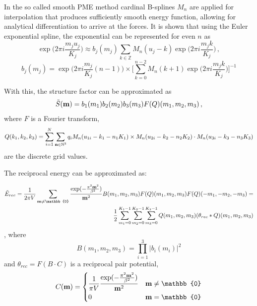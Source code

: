 \documentclass[12pt,a4paper]{report}
\newcommand{\draft}[1]{#1}
\begin{document}

In the so called smooth PME method \cite{spme} cardinal B-splines $M_n$ are applied for interpolation that produces sufficiently smooth energy function, allowing for analytical differentiation to arrive at the forces.
It is shown that using the Euler exponential spline, the exponential can be represented for even $n$ as
\[\exp\Big(2\pi i\frac{m_j u_j}{K_j}\Big) \approx b_j(m_j) \sum\limits_{k\in \mathbb{Z}}M_n(u_j - k)\exp\Big(2\pi i\frac{m_j k}{K_j}\Big)\,,\]
\begin{equation}\label{BSpline}
b_j(m_j) = \exp\Big(2\pi i\frac{m_j}{K_j}(n-1)\Big) \times \Big[\sum\limits_{k=0}^{n-2}M_n(k + 1)\exp\Big(2\pi i\frac{m_j k}{K_j}\Big) \Big]^{-1}
\end{equation}

With this, the structure factor can be approximated as
\[\tilde{S}(\bold{m}) = b_1(m_1) b_2(m_2)b_3(m_3) F(Q)(m_1, m_2, m_3)\,,\]
where $F$ is a Fourier transform,
\begin{equation} \label{Qspread}
Q(k_1, k_2, k_3) = \sum\limits_{i=1}^N \sum\limits_{\bold{n} \in \mathbb{N}^3} q_i M_n(u_{1i} -k_1 - n_1 K_1)\times M_n(u_{2i} -k_2 - n_2 K_2) \cdot M_n(u_{3i} -k_3 - n_3 K_3)
\end{equation}
are the discrete grid values.

The reciprocal energy can be approximated as:

\begin{equation}  \label{Erecfull}
\begin{split}
\tilde{E}_{rec} = \frac{1}{2 \pi V}\sum\limits_{\bold{m} \neq \mathbb{0}}\frac{\exp(-\frac{\pi^2\bold{m}^2}{\beta^2})}{\bold{m}^2} B(m_1, m_2, m_3) F(Q)(m_1, m_2, m_3)F(Q)(-m_1, -m_2, -m_3)= \\
\frac{1}{2}\sum\limits_{m_1 = 0}^{K_1 -1}\sum\limits_{m_2 = 0}^{K_2 -1}\sum\limits_{m_3 = 0}^{K_3 -1}Q(m_1, m_2, m_3)(\theta_{rec} \ast Q)(m_1, m_2, m_3)
\end{split}
\end{equation}, where 
\begin{equation} 
B(m_1, m_2, m_3) = \prod\limits_{i=1}^3 \lvert b_i(m_i) \rvert ^2
\end{equation}
and $\theta_{rec} = F(B\cdot C)$ is a reciprocal pair potential, 
\[C(\bold{m}) = \begin{dcases} 
\frac{1}{\pi V} \frac{\exp(-\frac{\pi^2\bold{m}^2}{\beta^2})}{\bold{m}^2} & \bold{m} \neq \mathbb{0}\\
0  & \bold{m} = \mathbb{0}
\end{dcases}
\]
\end{document}
